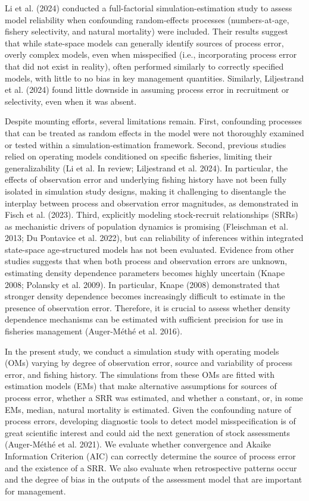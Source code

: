 \documentclass[
  12pt,
]{article}
\begin{document}
Li et al. (2024) conducted a full-factorial simulation-estimation study
to assess model reliability when confounding random-effects processes
(numbers-at-age, fishery selectivity, and natural mortality) were
included. Their results suggest that while state-space models can
generally identify sources of process error, overly complex models, even
when misspecified (i.e., incorporating process error that did not exist
in reality), often performed similarly to correctly specified models,
with little to no bias in key management quantities. Similarly,
Liljestrand et al. (2024) found little downside in assuming process
error in recruitment or selectivity, even when it was absent.

Despite mounting efforts, several limitations remain. First, confounding
processes that can be treated as random effects in the model were not
thoroughly examined or tested within a simulation-estimation framework.
Second, previous studies relied on operating models conditioned on
specific fisheries, limiting their generalizability (Li et al. In
review; Liljestrand et al. 2024). In particular, the effects of
observation error and underlying fishing history have not been fully
isolated in simulation study designs, making it challenging to
disentangle the interplay between process and observation error
magnitudes, as demonstrated in Fisch et al. (2023). Third, explicitly
modeling stock-recruit relationships (SRRs) as mechanistic drivers of
population dynamics is promising (Fleischman et al. 2013; Du Pontavice
et al. 2022), but can reliability of inferences within integrated
state-space age-structured models has not been evaluated. Evidence from
other studies suggests that when both process and observation errors are
unknown, estimating density dependence parameters becomes highly
uncertain (Knape 2008; Polansky et al. 2009). In particular, Knape
(2008) demonstrated that stronger density dependence becomes
increasingly difficult to estimate in the presence of observation error.
Therefore, it is crucial to assess whether density dependence mechanisms
can be estimated with sufficient precision for use in fisheries
management (Auger-Méthé et al. 2016).

In the present study, we conduct a simulation study with operating
models (OMs) varying by degree of observation error, source and
variability of process error, and fishing history. The simulations from
these OMs are fitted with estimation models (EMs) that make alternative
assumptions for sources of process error, whether a SRR was estimated,
and whether a constant, or, in some EMs, median, natural mortality is
estimated. Given the confounding nature of process errors, developing
diagnostic tools to detect model misspecification is of great scientific
interest and could aid the next generation of stock assessments
(Auger-Méthé et al. 2021). We evaluate whether convergence and Akaike
Information Criterion (AIC) can correctly determine the source of
process error and the existence of a SRR. We also evaluate when
retrospective patterns occur and the degree of bias in the outputs of
the assessment model that are important for management.
\end{document}
